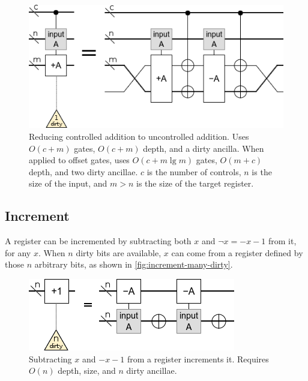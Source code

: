 \documentclass[twocolumn,longbibliography]{quantumarticle}
\begin{document}
\begin{figure}
  \centering
  \includegraphics[width=\linewidth]{assets/controlled-addition.png}
  \caption{
    Reducing controlled addition to uncontrolled addition.
    Uses $O(c + m)$ gates, $O(c + m)$ depth, and a dirty ancilla.
    When applied to offset gates, uses $O(c + m \lg m)$ gates, $O(m + c)$ depth, and two dirty ancillae.
    $c$ is the number of controls, $n$ is the size of the input, and $m > n$ is the size of the target register.
  }
  \label{fig:controlled-addition}
\end{figure}


\subsection{Increment}

A register can be incremented by subtracting both $x$ and $\neg x = -x-1$ from it, for any $x$.
When $n$ dirty bits are available, $x$ can come from a register defined by those $n$ arbitrary bits, as shown in \autoref{fig:increment-many-dirty}.

\begin{figure}
  \centering
  \includegraphics[width=\linewidth]{assets/increment-many-dirty.png}
  \caption{ Subtracting $x$ and $-x-1$ from a register increments it. Requires $O(n)$ depth, size, and $n$ dirty ancillae.}
  \label{fig:increment-many-dirty}
\end{figure}
\end{document}
